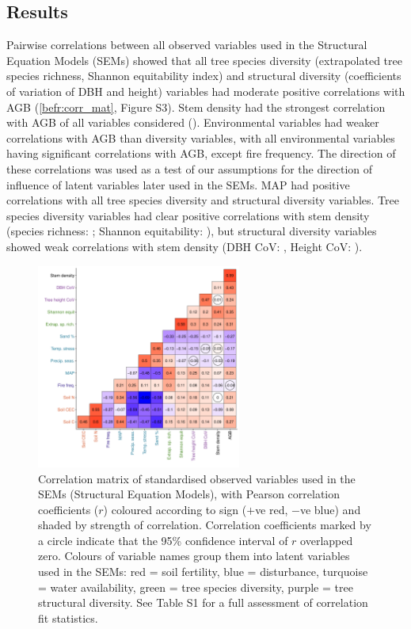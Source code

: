 \begin{refsection}
\section{Results}
\label{befr:sec:results}

Pairwise correlations between all observed variables used in the Structural Equation Models (SEMs) showed that all tree species diversity (extrapolated tree species richness, Shannon equitability index) and structural diversity (coefficients of variation of DBH and height) variables had moderate positive correlations with AGB (\autoref{befr:corr_mat}, Figure S3). Stem density had the strongest correlation with AGB of all variables considered (\ccib{}). Environmental variables had weaker correlations with AGB than diversity variables, with all environmental variables having significant correlations with AGB, except fire frequency. The direction of these correlations was used as a test of our assumptions for the direction of influence of latent variables later used in the SEMs. MAP had positive correlations with all tree species diversity and structural diversity variables. Tree species diversity variables had clear positive correlations with stem density (species richness: \ccsi{}; Shannon equitability: \ccei{}), but structural diversity variables showed weak correlations with stem density (DBH CoV: \ccdvi{}, Height CoV: \cchvi{}).

\begin{figure}[tb]
\centering
	\includegraphics[width=0.6\textwidth]{img/corr_mat}
	\caption[Correlation matrix of observed variables used in analysis]{Correlation matrix of standardised observed variables used in the SEMs (Structural Equation Models), with Pearson correlation coefficients ($r$) coloured according to sign ($+$ve red, $-$ve blue) and shaded by strength of correlation. Correlation coefficients marked by a circle indicate that the 95\% confidence interval of $r$ overlapped zero. Colours of variable names group them into latent variables used in the SEMs: red = soil fertility, blue = disturbance, turquoise = water availability, green = tree species diversity, purple = tree structural diversity. See Table S1 for a full assessment of correlation fit statistics.}
	\label{befr:corr_mat}
\end{figure}


\end{refsection}
